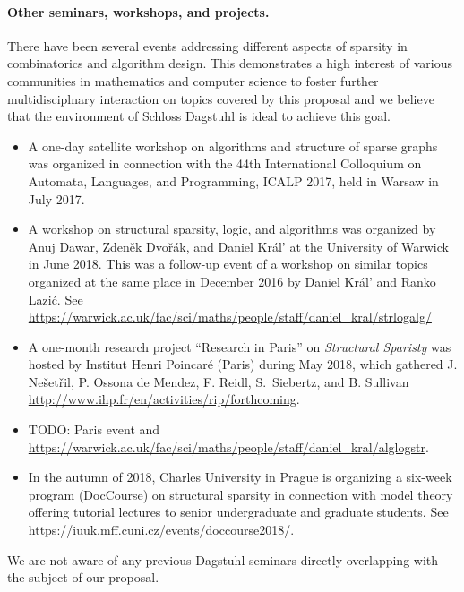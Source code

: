\paragraph*{Other seminars, workshops, and projects.}
There have been several events addressing different aspects of sparsity in combinatorics and algorithm design.
This demonstrates a high interest of various communities in mathematics and computer science
to foster further multidisciplnary interaction on topics covered by this proposal and
we believe that the environment of Schloss Dagstuhl is ideal to achieve this goal.
\begin{itemize}
\item A one-day satellite workshop on algorithms and structure of sparse graphs was organized in connection with the 44th International Colloquium on Automata, Languages, and Programming, ICALP 2017, held in Warsaw in July 2017.
\item A workshop on structural sparsity, logic, and algorithms was organized by Anuj Dawar, Zden\v ek Dvo\v{r}\'ak, and Daniel Kr\'al' at the University of Warwick in June 2018. This was a follow-up event of a workshop on similar topics organized at the same place in December 2016 by Daniel Kr\'al' and Ranko Lazi\'c. See \url{https://warwick.ac.uk/fac/sci/maths/people/staff/daniel_kral/strlogalg/}
\item A one-month research project ``Research in Paris'' on {\em Structural Sparisty} was hosted by Institut Henri Poincar\'e (Paris) during May 2018, which gathered J. Ne\v set\v ril, P. Ossona de Mendez, F. Reidl, S.~Siebertz, and B. Sullivan 
\url{http://www.ihp.fr/en/activities/rip/forthcoming}.
\item TODO: Paris event
and \url{https://warwick.ac.uk/fac/sci/maths/people/staff/daniel_kral/alglogstr}.
\item In the autumn of 2018, Charles University in Prague is organizing a six-week program (DocCourse) on structural sparsity in connection with model theory offering tutorial lectures to senior undergraduate and graduate students. See \url{https://iuuk.mff.cuni.cz/events/doccourse2018/}.
\end{itemize}
We are not aware of any previous Dagstuhl seminars directly overlapping with the subject of our proposal.
